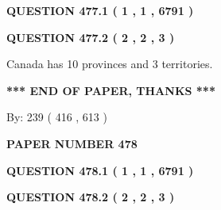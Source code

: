 \documentclass[12pt]{article}
\begin{document}
   
  
\vspace{0.2in}
  
{\textbf{\Large{QUESTION
477.1 
 ( 1 , 1 , 6791 )
}}}
  
  
  
\vspace{0.2in}
  
{\textbf{\Large{QUESTION
477.2 
 ( 2 , 2 , 3 )
}}}
  
  
 
 
\noindent{}
 
 
Canada has 10  provinces and 3 territories.
 
 
 
 
   
   
 \vspace{0.2in}
 
   
   
   
   
\vspace{1.0in} 
{\textbf{\large{ *** END OF PAPER, THANKS *** }}} 
   
   
\hspace{1.0in} By: 
 239 ( 416 ,  613 )
   
   
   
   
\newpage 
\setcounter{page}{ 
   478001 } 
   
   
   
   
 {\textbf{ \Large{ PAPER NUMBER  478  }}}
   
   
\vspace{0.2in}
   
   
   
   
   
   
 \vspace{0.2in}
 
 
 
 
   
   
  
\vspace{0.2in}
  
{\textbf{\Large{QUESTION
478.1 
 ( 1 , 1 , 6791 )
}}}
  
  
  
\vspace{0.2in}
  
{\textbf{\Large{QUESTION
478.2 
 ( 2 , 2 , 3 )
}}}
  
\end{document}

